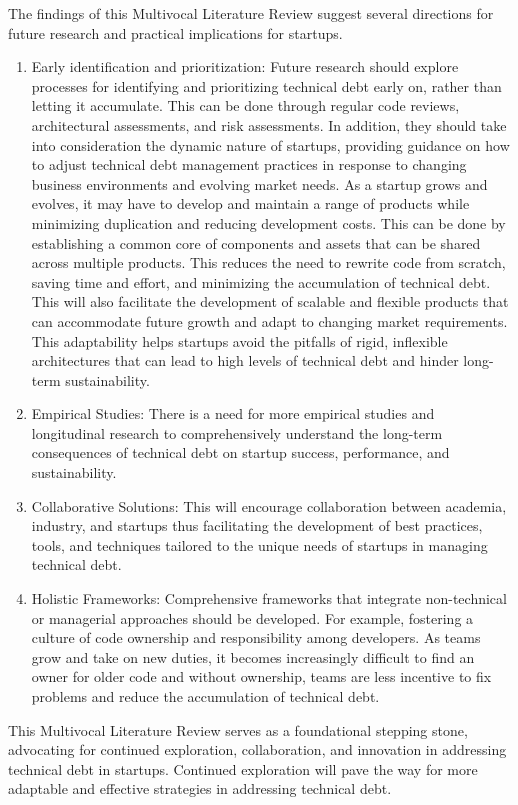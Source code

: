 The findings of this Multivocal Literature Review suggest several directions for future research and practical implications for startups.
\begin{enumerate}
    \item Early identification and prioritization: Future research should explore processes for identifying and prioritizing technical debt early on, rather than letting it accumulate. This can be done through regular code reviews, architectural assessments, and risk assessments. In addition, they should take into consideration the dynamic nature of startups, providing guidance on how to adjust technical debt management practices in response to changing business environments and evolving market needs. As a startup grows and evolves, it may have to develop and maintain a range of products while minimizing duplication and reducing development costs. This can be done by establishing a common core of components and assets that can be shared across multiple products. This reduces the need to rewrite code from scratch, saving time and effort, and minimizing the accumulation of technical debt. This will also facilitate the development of scalable and flexible products that can accommodate future growth and adapt to changing market requirements. This adaptability helps startups avoid the pitfalls of rigid, inflexible architectures that can lead to high levels of technical debt and hinder long-term sustainability.
    \item Empirical Studies: There is a need for more empirical studies and longitudinal research to comprehensively understand the long-term consequences of technical debt on startup success, performance, and sustainability.
    \item Collaborative Solutions: This will encourage collaboration between academia, industry, and startups thus facilitating the development of best practices, tools, and techniques tailored to the unique needs of startups in managing technical debt.
    \item Holistic Frameworks: Comprehensive frameworks that integrate non-technical or managerial approaches should be developed. For example, fostering a culture of code ownership and responsibility among developers. As teams grow and take on new duties, it becomes increasingly difficult to find an owner for older code and without ownership, teams are less incentive to fix problems and reduce the accumulation of technical debt.
\end{enumerate}

This Multivocal Literature Review serves as a foundational stepping stone, advocating for continued exploration, collaboration, and innovation in addressing technical debt in startups.
Continued exploration will pave the way for more adaptable and effective strategies in addressing technical debt.
